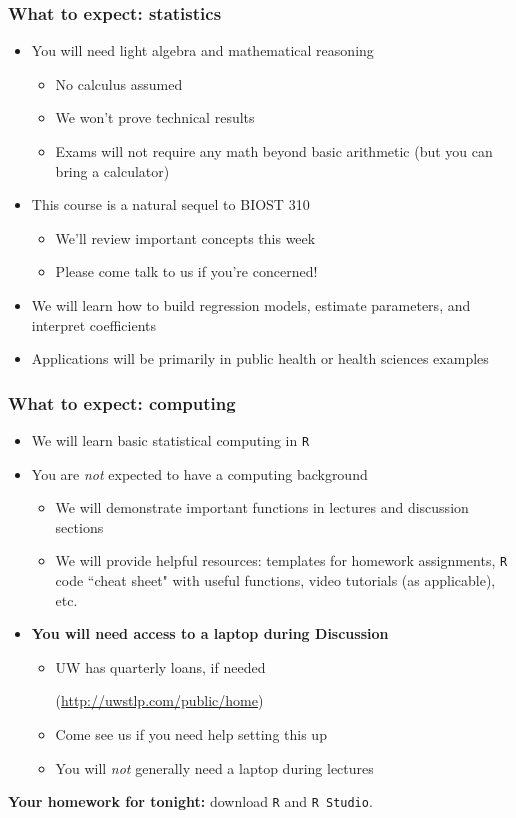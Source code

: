 \documentclass[12pt, 
hyperref={colorlinks=true, linkcolor=blue, urlcolor=cyan}]{beamer}
\begin{document}
\begin{frame}
\frametitle{What to expect: statistics}
\begin{itemize}
\item You will need light algebra and mathematical reasoning
	\begin{itemize}
	\item No calculus assumed
	\item We won't prove technical results
	\item Exams will not require any math beyond basic arithmetic (but you can bring a calculator)
	\end{itemize}
\item This course is a natural sequel to BIOST 310
	\begin{itemize}
	\item We'll review important concepts this week
	\item Please come talk to us if you're concerned! 
	\end{itemize}
\item We will learn how to build regression models, estimate parameters, and interpret coefficients
\item Applications will be primarily in public health or health sciences examples
\end{itemize}
\end{frame}

\begin{frame}
\frametitle{What to expect: computing}
\begin{itemize}
\item We will learn basic statistical computing in \texttt{R}
\item You are \textit{not} expected to have a computing background
	\begin{itemize}
	\item We will demonstrate important functions in lectures and discussion sections
	\item We will provide helpful resources: templates for homework assignments, \texttt{R} code ``cheat sheet" with useful functions, video tutorials (as applicable), etc.
	\end{itemize}
\item \textbf{You will need access to a laptop during Discussion}
	\begin{itemize}
	\item UW has quarterly loans, if needed \begin{tiny} (\href{http://uwstlp.com/public/home}{http://uwstlp.com/public/home}) \end{tiny}
	\item Come see us if you need help setting this up
	\item You will \textit{not} generally need a laptop during lectures
	\end{itemize}
\end{itemize}

\textbf{Your homework for tonight:} download \texttt{R} and \texttt{R Studio}.

\end{frame}
\end{document}
